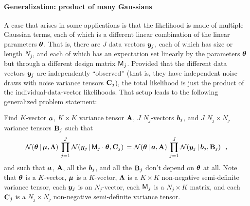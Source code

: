 \paragraph{Generalization: product of many Gaussians}

A case that arises in some applications is that the
likelihood is made of multiple Gaussian terms, each of which is a
different linear combination of the linear parameters $\boldsymbol{\theta}$.
That is, there are $J$ data vectors $\boldsymbol{y}_j$, each of which has size or length $N_j$,
and each of which has an expectation
set linearly by the parameters $\boldsymbol{\theta}$ but through a different design matrix $\mathsf{M}_j$.
Provided that the different data vectors $\boldsymbol{y}_j$ are independently ``observed'' (that
is, they have independent noise draws with noise variance tensors $\mathbf{C}_j$),
the total likelihood is just the product of
the individual-data-vector likelihoods.
That setup leads to the following generalized problem statement:

Find $K$-vector $\boldsymbol{a}$, $K\times K$ variance tensor $\mathbf{A}$, $J$ $N_j$-vectors $\boldsymbol{b}_j$,
and $J$ $N_j\times N_j$ variance tensors $\mathbf{B}_j$ such that
\begin{equation}\label{eq:genproblem}
\mathcal{N}\!\,(\boldsymbol{\theta}\,|\,\boldsymbol{\mu},\mathbf{\Lambda})\,\prod_{j=1}^J\mathcal{N}\!\,(\boldsymbol{y}_j\,|\,\mathsf{M}_j\cdot\boldsymbol{\theta},\mathbf{C}_j)\,
 = \mathcal{N}\!\,(\boldsymbol{\theta}\,|\,\boldsymbol{a},\mathbf{A})\,\prod_{j=1}^J\mathcal{N}\!\,(\boldsymbol{y}_j\,|\,\boldsymbol{b}_j,\mathbf{B}_j) ~~,
\end{equation}
and such that $\boldsymbol{a}$, $\mathbf{A}$, all the $\boldsymbol{b}_j$, and all the $\mathbf{B}_j$
don't depend on $\boldsymbol{\theta}$ at all.
Note that
$\boldsymbol{\theta}$ is a $K$-vector,
$\boldsymbol{\mu}$ is a $K$-vector,
$\mathbf{\Lambda}$ is a $K\times K$ non-negative semi-definite variance tensor,
each $\boldsymbol{y}_j$ is an $N_j$-vector,
each $\mathsf{M}_j$ is a $N_j\times K$ matrix,
and
each $\mathbf{C}_j$ is a $N_j\times N_j$ non-negative semi-definite variance tensor.

